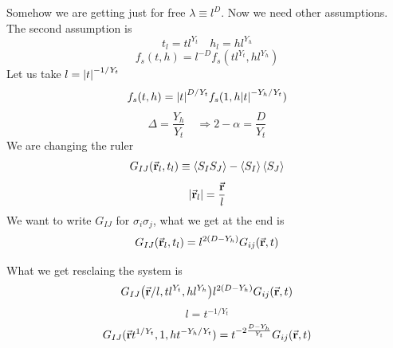 \documentclass[../main/main.tex]{subfiles}
\begin{document}
Somehow we are getting just for free \( \lambda \equiv l^D \). Now we need other assumptions. The second assumption is
\begin{equation}
  t_l = t l^{Y_t} \quad h_l = h l^{Y_h}
\end{equation}
\begin{equation}
  f_s (t,h) = l^{-D} f_s (t l^{Y_t}, h l^{Y_h})
\end{equation}
Let us take \( l= \abs{t}^{-1/Y_t}  \)
\begin{equation}
  f_s (t,h) = \abs{t}^{D/Y_t} f_s (1, h \abs{t}^{-Y_h/Y_t} )
\end{equation}
\begin{equation}
  \Delta = \frac{Y_h}{Y_t} \quad \Rightarrow 2 - \alpha = \frac{D}{Y_t}
\end{equation}
We are changing the ruler
\begin{equation}
  G_{IJ} (\va{r}_l, t_l) \equiv \expval{S_I S_J} - \expval{S_I}\expval{S_J}
\end{equation}
\begin{equation}
  \abs{\va{r}_l} = \frac{\va{r}}{l}
\end{equation}
We want to write \( G_{IJ} \) for \( \sigma _i \sigma _j \), what we get at the end is
\begin{equation}
  G_{IJ} (\va{r}_l, t_l) = l^{2(D-Y_h)} G_{ij} (\va{r},t)
\end{equation}

What we get resclaing the system is
\begin{equation}
  G_{IJ} \qty(\va{r}/l, t l ^{Y_t}, h l^{Y_h}) l^{2(D-Y_h)} G_{ij} (\va{r},t)
\end{equation}
\begin{equation}
  l = t^{-1/Y_t}
\end{equation}
\begin{equation}
  G_{IJ} (\va{r} t^{1/Y_t}, 1, h t^{-Y_h/Y_t}) = t^{-2 \frac{D- Y_h}{Y_t}} G_{ij} (\va{r},t)
\end{equation}
\end{document}
